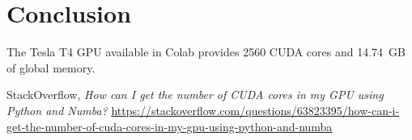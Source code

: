 \documentclass[hidelinks,12pt,a4paper]{article}
\begin{document}
\section{Conclusion}
The Tesla T4 GPU available in Colab provides 2560 CUDA cores and 14.74~GB of global memory.


\begin{thebibliography}{9}
StackOverflow, \emph{How can I get the number of CUDA cores in my GPU using Python and Numba?}  
\url{https://stackoverflow.com/questions/63823395/how-can-i-get-the-number-of-cuda-cores-in-my-gpu-using-python-and-numba}
\end{thebibliography}
\end{document}
